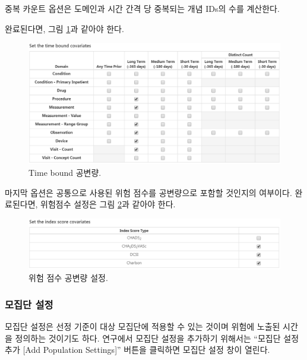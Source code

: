 \documentclass[11pt]{book}
\theoremstyle{definition}
\theoremstyle{definition}
\theoremstyle{definition}
\theoremstyle{remark}
\begin{document}
중복 카운트 옵션은 도메인과 시간 간격 당 중복되는 개념 IDs의 수를
계산한다.

완료된다면, 그림 \ref{fig:covariateSettings5}과 같아야 한다.

\begin{figure}

{\centering \includegraphics[width=1\linewidth]{images/PatientLevelPrediction/covariateSettings5} 

}

\caption{Time bound 공변량.}\label{fig:covariateSettings5}
\end{figure}

마지막 옵션은 공통으로 사용된 위험 점수를 공변량으로 포함할 것인지의
여부이다. 완료된다면, 위험점수 설정은 그림
\ref{fig:covariateSettings6}과 같아야 한다.

\begin{figure}

{\centering \includegraphics[width=1\linewidth]{images/PatientLevelPrediction/covariateSettings6} 

}

\caption{위험 점수 공변량 설정.}\label{fig:covariateSettings6}
\end{figure}

\subsubsection*{모집단 설정}\label{-}

모집단 설정은 선정 기준이 대상 모집단에 적용할 수 있는 것이며 위험에
노출된 시간을 정의하는 것이기도 하다. 연구에서 모집단 설정을 추가하기
위해서는 ``모집단 설정 추가 {[}Add Population Settings{]}'' 버튼을
클릭하면 모집단 설정 창이 열린다.
\end{document}
